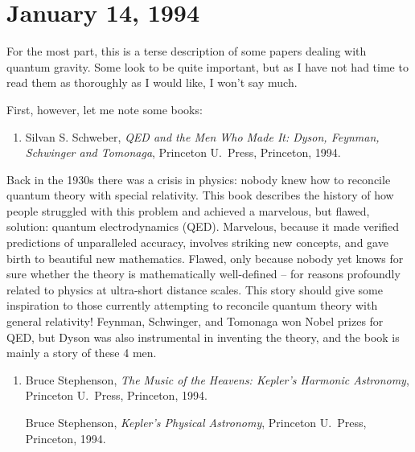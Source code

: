 \documentclass[12pt]{article}
\def\tightlist{}
\begin{document}
\hypertarget{week30}{%
\section{January 14, 1994}\label{week30}}

For the most part, this is a terse description of some papers dealing
with quantum gravity. Some look to be quite important, but as I have not
had time to read them as thoroughly as I would like, I won't say much.

First, however, let me note some books:

\begin{enumerate}
\def\labelenumi{\arabic{enumi})}
\tightlist
\item
   Silvan S. Schweber, \emph{QED and the Men Who Made It: Dyson, Feynman, Schwinger and
  Tomonaga}, Princeton U.\ Press, Princeton, 1994.
\end{enumerate}

Back in the 1930s there was a crisis in physics: nobody knew how to
reconcile quantum theory with special relativity. This book describes
the history of how people struggled with this problem and achieved a
marvelous, but flawed, solution: quantum electrodynamics (QED).
Marvelous, because it made verified predictions of unparalleled
accuracy, involves striking new concepts, and gave birth to beautiful
new mathematics. Flawed, only because nobody yet knows for sure whether
the theory is mathematically well-defined -- for reasons profoundly
related to physics at ultra-short distance scales. This story should
give some inspiration to those currently attempting to reconcile quantum
theory with general relativity! Feynman, Schwinger, and Tomonaga won
Nobel prizes for QED, but Dyson was also instrumental in inventing the
theory, and the book is mainly a story of these 4 men.

\begin{enumerate}
\def\labelenumi{\arabic{enumi})}
\setcounter{enumi}{1}
\item
  Bruce Stephenson, \emph{The Music of the Heavens: Kepler's Harmonic Astronomy},  
  Princeton U.\ Press, Princeton, 1994.

   Bruce Stephenson, \emph{Kepler's Physical Astronomy}, Princeton U.\
  Press, Princeton, 1994.
\end{enumerate}
\end{document}

